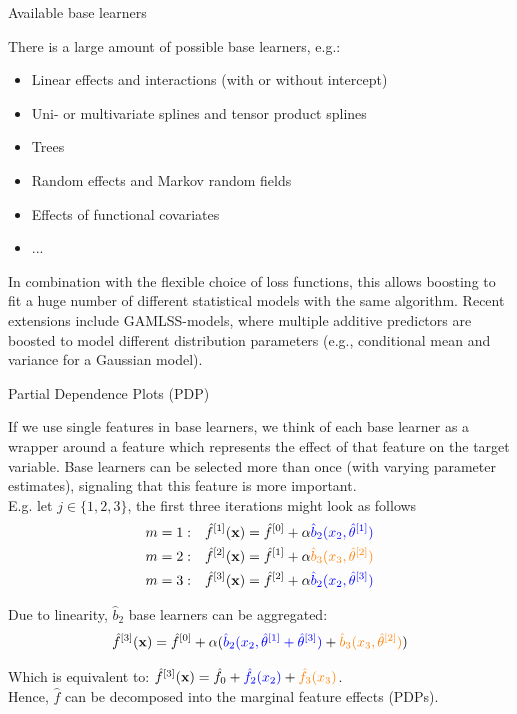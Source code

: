 \begin{vbframe}{Available base learners}

There is a large amount of possible base learners, e.g.:

\begin{itemize}
  \item Linear effects and interactions (with or without intercept)
  \item Uni- or multivariate splines and tensor product splines
  \item Trees
  \item Random effects and Markov random fields
  \item Effects of functional covariates
  \item ...
\end{itemize}

\lz

In combination with the flexible choice of loss functions, this allows boosting to fit  a huge number of different statistical models with the same algorithm. Recent extensions include GAMLSS-models, where multiple additive predictors are boosted to model different distribution parameters (e.g., conditional mean and variance for a Gaussian model).

\end{vbframe}
\begin{vbframe}{Partial Dependence Plots (PDP)}

If we use single features in base learners, we think of each base learner as a wrapper around a feature which represents the effect of that feature on the target variable. Base learners can be selected more than once (with varying parameter estimates), signaling that this feature is more important.\\
E.g. let $j \in \{ 1,2,3 \}$, the first three iterations might look as follows
\begin{align*}
m = 1: \quad & \hat{f}^{[1]}(\mathbf{x}) = \hat{f}^{[0]} + \alpha \textcolor{blue}{\hat{b}_2(x_2, \hat{\theta}^{[1]})}\\
m = 2: \quad & \hat{f}^{[2]}(\mathbf{x}) = \hat{f}^{[1]} + \alpha  \textcolor{orange}{\hat{b}_3(x_3, \hat{\theta}^{[2]})}\\
m = 3: \quad & \hat{f}^{[3]}(\mathbf{x}) = \hat{f}^{[2]} + \alpha \textcolor{blue}{\hat{b}_2(x_2, \hat{\theta}^{[3]})}
\end{align*}

Due to linearity, $\hat{b}_2$ base learners can be aggregated:
$$
\hat{f}^{[3]}(\mathbf{x}) = \hat{f}^{[0]} + \alpha (\textcolor{blue}{\hat{b}_2(x_2, \hat{\theta}^{[1]} + \hat{\theta}^{[3]})} + \textcolor{orange}{\hat{b}_3(x_3, \hat{\theta}^{[2]})})
$$

Which is equivalent to:
$\hat{f}^{[3]}(\mathbf{x}) = \hat{f}_0 + \textcolor{blue}{\hat{f}_2(x_2)} + \textcolor{orange}{\hat{f}_3(x_3)}$.\\
Hence, $\hat{f}$ can be decomposed into the marginal feature effects (PDPs).



\end{vbframe}




